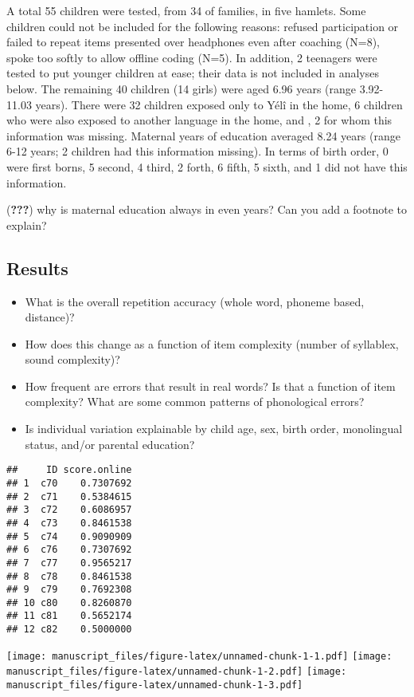 \documentclass[english,,man,floatsintext]{apa6}
\begin{document}
A total 55 children were tested, from 34 of families, in five hamlets. Some children could not be included for the following reasons: refused participation or failed to repeat items presented over headphones even after coaching (N=8), spoke too softly to allow offline coding (N=5). In addition, 2 teenagers were tested to put younger children at ease; their data is not included in analyses below. The remaining 40 children (14 girls) were aged 6.96 years (range 3.92-11.03 years). There were 32 children exposed only to Yélî in the home, 6 children who were also exposed to another language in the home, and , 2 for whom this information was missing. Maternal years of education averaged 8.24 years (range 6-12 years; 2 children had this information missing). In terms of birth order, 0 were first borns, 5 second, 4 third, 2 forth, 6 fifth, 5 sixth, and 1 did not have this information.

({\textbf{???}}) why is maternal education always in even years? Can you add a footnote to explain?

\hypertarget{results}{%
\subsection{Results}\label{results}}

\begin{itemize}
\item
  What is the overall repetition accuracy (whole word, phoneme based, distance)?
\item
  How does this change as a function of item complexity (number of syllablex, sound complexity)?
\item
  How frequent are errors that result in real words? Is that a function of item complexity? What are some common patterns of phonological errors?
\item
  Is individual variation explainable by child age, sex, birth order, monolingual status, and/or parental education?
\end{itemize}

\begin{verbatim}
##     ID score.online
## 1  c70    0.7307692
## 2  c71    0.5384615
## 3  c72    0.6086957
## 4  c73    0.8461538
## 5  c74    0.9090909
## 6  c76    0.7307692
## 7  c77    0.9565217
## 8  c78    0.8461538
## 9  c79    0.7692308
## 10 c80    0.8260870
## 11 c81    0.5652174
## 12 c82    0.5000000
\end{verbatim}

\texttt{[image: manuscript\_files/figure-latex/unnamed-chunk-1-1.pdf]} \texttt{[image: manuscript\_files/figure-latex/unnamed-chunk-1-2.pdf]} \texttt{[image: manuscript\_files/figure-latex/unnamed-chunk-1-3.pdf]}
\end{document}

